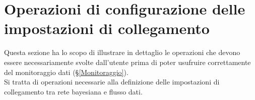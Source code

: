 \section{Operazioni di configurazione delle impostazioni di collegamento}\label{PreMonitoraggio}
Questa sezione ha lo scopo di illustrare in dettaglio le operazioni che devono essere necessariamente svolte dall'utente prima di poter usufruire correttamente del monitoraggio dati (§\ref{Monitoraggio}).\\
Si tratta di operazioni necessarie alla definizione delle impostazioni di collegamento tra rete bayesiana e flusso dati.




\pagebreak



\pagebreak



\pagebreak



\pagebreak



\pagebreak



\pagebreak